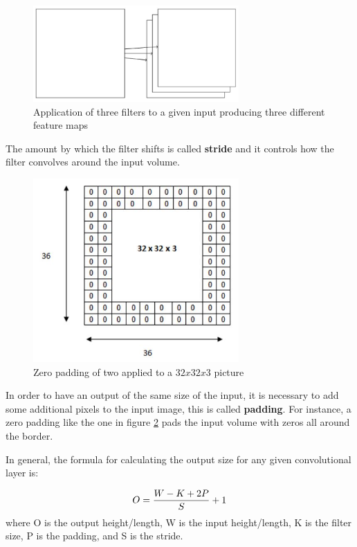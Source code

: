 \begin{figure}[h]
	\centering
	\includegraphics[width=0.7\textwidth]{Images/feature_maps}
	\caption{Application of three filters to a given input producing three different feature maps}\label{fig:feature_maps}
\end{figure}

The amount by which the filter shifts is called \textbf{stride} and it controls how the filter convolves around the input volume.

\begin{figure}[h]
	\centering
	\includegraphics[width=0.7\textwidth]{Images/zero_padding}
	\caption{Zero padding of two applied to a $32x32x3$ picture}\label{fig:zero_padding}
\end{figure}

In order to have an output of the same size of the input, it is necessary to add some additional pixels to the input image, this is called \textbf{padding}. For instance, a zero padding like the one in figure \ref{fig:zero_padding} pads the input volume with zeros all around the border.

In general, the formula for calculating the output size for any given convolutional layer is:

\begin{equation} \notag
	O=\frac{W-K+2P}{S}+1
\end{equation}
where O is the output height/length, W is the input height/length, K is the filter size, P is the padding, and S is the stride.
